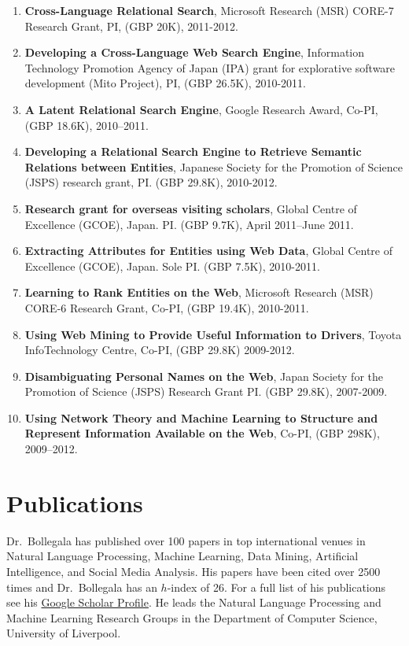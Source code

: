 \documentclass[a4paper,11pt]{article}
\begin{document}
\begin{enumerate}
\item \textbf{Cross-Language Relational Search}, Microsoft Research (MSR) CORE-7 Research Grant, PI, (GBP 20K), 2011-2012.

\item \textbf{Developing a Cross-Language Web Search Engine}, Information Technology Promotion Agency of Japan (IPA) grant for explorative software development (Mito Project), PI, (GBP 26.5K), 2010-2011.

\item \textbf{A Latent Relational Search Engine}, Google Research Award, Co-PI, (GBP 18.6K), 2010–2011.

\item \textbf{Developing a Relational Search Engine to Retrieve Semantic Relations between Entities}, Japanese Society for the Promotion of Science (JSPS) research grant, PI. (GBP 29.8K), 2010-2012.

\item \textbf{Research grant for overseas visiting scholars}, Global Centre of Excellence (GCOE), Japan. PI. (GBP 9.7K), April 2011–June 2011.

\item \textbf{Extracting Attributes for Entities using Web Data}, Global Centre of Excellence (GCOE), Japan. Sole PI. (GBP 7.5K), 2010-2011.

\item \textbf{Learning to Rank Entities on the Web}, Microsoft Research (MSR) CORE-6 Research Grant, Co-PI, (GBP 19.4K), 2010-2011.

\item \textbf{Using Web Mining to Provide Useful Information to Drivers}, Toyota InfoTechnology Centre, Co-PI, (GBP 29.8K) 2009-2012.

\item \textbf{Disambiguating Personal Names on the Web}, Japan Society for the Promotion of Science (JSPS) Research Grant PI. (GBP 29.8K), 2007-2009.

\item \textbf{Using Network Theory and Machine Learning to Structure and Represent Information Available on the Web}, Co-PI, (GBP 298K), 2009–2012.
\end{enumerate}


\newpage
\section{Publications}

Dr.~Bollegala has published over 100 papers in top international venues in Natural Language Processing, Machine Learning, Data Mining, Artificial Intelligence, and Social Media Analysis.
His papers have been cited over 2500 times and Dr.~Bollegala has an $h$-index of 26.
For a full list of his publications see his \href{https://goo.gl/mnhgp6}{Google Scholar Profile}.
He leads the Natural Language Processing and Machine Learning Research Groups in the Department of Computer Science, University of Liverpool.


\end{document}
